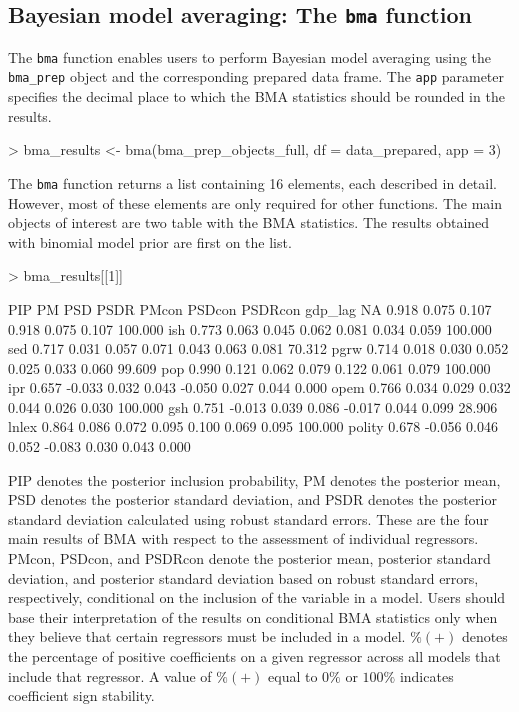 \documentclass[a4paper]{article}
\begin{document}
\subsection{Bayesian model averaging: The \texttt{bma} function}
The \verb+bma+ function enables users to perform Bayesian model averaging using the \verb+bma_prep+ object and the corresponding prepared data frame.
The \verb+app+ parameter specifies the decimal place to which the BMA statistics should be rounded in the results.
\begin{Schunk}
\begin{Sinput}
> bma_results <- bma(bma_prep_objects_full, df = data_prepared, app = 3)
\end{Sinput}
\end{Schunk}
The \verb+bma+ function returns a list containing 16 elements, each described in detail.
However, most of these elements are only required for other functions.
The main objects of interest are two table with the BMA statistics.
The results obtained with binomial model prior are first on the list.
\begin{Schunk}
\begin{Sinput}
> bma_results[[1]]
\end{Sinput}
\begin{Soutput}
          PIP     PM   PSD  PSDR  PMcon PSDcon PSDRcon    %
gdp_lag    NA  0.918 0.075 0.107  0.918  0.075   0.107 100.000
ish     0.773  0.063 0.045 0.062  0.081  0.034   0.059 100.000
sed     0.717  0.031 0.057 0.071  0.043  0.063   0.081  70.312
pgrw    0.714  0.018 0.030 0.052  0.025  0.033   0.060  99.609
pop     0.990  0.121 0.062 0.079  0.122  0.061   0.079 100.000
ipr     0.657 -0.033 0.032 0.043 -0.050  0.027   0.044   0.000
opem    0.766  0.034 0.029 0.032  0.044  0.026   0.030 100.000
gsh     0.751 -0.013 0.039 0.086 -0.017  0.044   0.099  28.906
lnlex   0.864  0.086 0.072 0.095  0.100  0.069   0.095 100.000
polity  0.678 -0.056 0.046 0.052 -0.083  0.030   0.043   0.000
\end{Soutput}
\end{Schunk}

PIP denotes the posterior inclusion probability, PM denotes the posterior mean, PSD denotes the posterior standard deviation, and PSDR denotes the posterior standard deviation calculated using robust standard errors.
These are the four main results of BMA with respect to the assessment of individual regressors.
PMcon, PSDcon, and PSDRcon denote the posterior mean, posterior standard deviation, and posterior standard deviation based on robust standard errors, respectively, conditional on the inclusion of the variable in a model.
Users should base their interpretation of the results on conditional BMA statistics only when they believe that certain regressors must be included in a model.
$\%(+)$ denotes the percentage of positive coefficients on a given regressor across all models that include that regressor.
A value of $\%(+)$ equal to $0\%$ or $100\%$ indicates coefficient sign stability.
\end{document}
